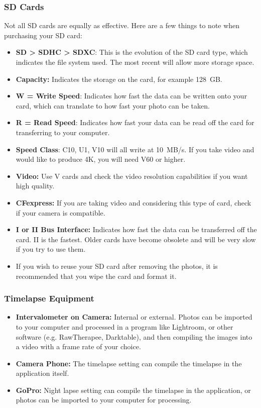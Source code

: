 \documentclass{article}
\newcommand{\contributed}[1]{%
    \par\noindent
    \begingroup
    \setlength{\leftskip}{1em}%
    \itshape
    Contributors: #1
    \par
    \endgroup
    \vspace{0.5em}
}
\begin{document}
\subsubsection{SD Cards}
Not all SD cards are equally as effective.   Here are a few things to note when purchasing your SD card:
\begin{itemize}
    \item \textbf{SD > SDHC > SDXC}: This is the evolution of the SD card type, which indicates the file system used. The most recent will allow more storage space.
    \item \textbf{Capacity:} Indicates the storage on the card, for example 128~GB.
    \item \textbf{W = Write Speed}: Indicates how fast the data can be written onto your card, which can translate to how fast your photo can be taken.
    \item \textbf{R = Read Speed}: Indicates how fast your data can be read off the card for transferring to your computer.
    \item \textbf{Speed Class}: C10, U1, V10 will all write at 10~MB/s. If you take video and would like to produce 4K, you will need V60 or higher.  
    \item \textbf{Video: } Use V cards and check the video resolution capabilities if you want high quality. 
    \item \textbf{CFexpress:}  If you are taking video and considering this type of card, check if your camera is compatible.
    \item \textbf{I or II Bus Interface:}  Indicates how fast the data can be transferred off the card.  II is the fastest.  Older cards have become obsolete and will be very slow if you try to use them.
    \item If you wish to reuse your SD card after removing the photos, it is recommended that you wipe the card and format it.
\end{itemize}

\subsubsection{Timelapse Equipment}

\begin{itemize}
    \item\textbf{Intervalometer on Camera:} Internal or external.  Photos can be imported to your computer and processed in a program like Lightroom, or other software (e.g. RawTherapee, Darktable), and then compiling the images into a video with a frame rate of your choice.

    \item\textbf{Camera Phone:}  The timelapse setting can compile the timelapse in the application itself.

    \item\textbf{GoPro:} Night lapse setting can compile the timelapse in the application, or photos can be imported to your computer for processing.

\end{itemize}
\end{document}

